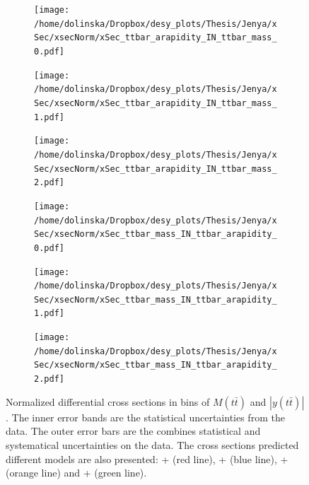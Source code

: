 \begin{figure}
\centering
\begin{subfigure}
  \centering
  \texttt{[image: /home/dolinska/Dropbox/desy\_plots/Thesis/Jenya/xSec/xsecNorm/xSec\_ttbar\_arapidity\_IN\_ttbar\_mass\_0.pdf]}
\end{subfigure}
\begin{subfigure}
  \centering
  \texttt{[image: /home/dolinska/Dropbox/desy\_plots/Thesis/Jenya/xSec/xsecNorm/xSec\_ttbar\_arapidity\_IN\_ttbar\_mass\_1.pdf]}
\end{subfigure}
\begin{subfigure}
  \centering
  \texttt{[image: /home/dolinska/Dropbox/desy\_plots/Thesis/Jenya/xSec/xsecNorm/xSec\_ttbar\_arapidity\_IN\_ttbar\_mass\_2.pdf]}
\end{subfigure}
\begin{subfigure}
  \centering
  \texttt{[image: /home/dolinska/Dropbox/desy\_plots/Thesis/Jenya/xSec/xsecNorm/xSec\_ttbar\_mass\_IN\_ttbar\_arapidity\_0.pdf]}
\end{subfigure}
\begin{subfigure}
  \centering
  \texttt{[image: /home/dolinska/Dropbox/desy\_plots/Thesis/Jenya/xSec/xsecNorm/xSec\_ttbar\_mass\_IN\_ttbar\_arapidity\_1.pdf]}
\end{subfigure}
\begin{subfigure}
  \centering
  \texttt{[image: /home/dolinska/Dropbox/desy\_plots/Thesis/Jenya/xSec/xsecNorm/xSec\_ttbar\_mass\_IN\_ttbar\_arapidity\_2.pdf]}
\end{subfigure}
\caption{Normalized differential cross sections in bins of $M(t\bar{t})$ and $|y(t\bar{t})|$. The inner error bands are the statistical uncertainties from the data.
         The outer error bars are the combines statistical and systematical uncertainties on the data. The cross sections predicted different models are also presented:
         \MG + \PYTHIA (red line), \Powheg + \PYTHIA (blue line), \Powheg + \HERWIG (orange line) and \MCNLO + \HERWIG (green line).}
\label{fig:XS_2D_ytt_Mtt}
\end{figure}

